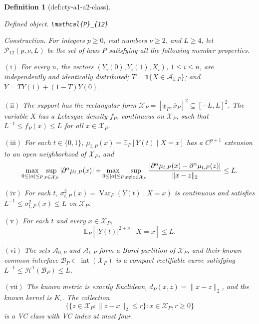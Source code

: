 \documentclass{article}
\newtheorem{definition}{Definition}
\begin{document}
\begin{definition}[def:cty-a1-a2-class]\label{def:cty-a1-a2-class}
\par\smallskip\noindent\emph{Defined object.} \texttt{\textbackslash{}\allowbreak{}mathcal\{P\}\allowbreak{}\_\allowbreak{}\{12\}\allowbreak{}}
\par\smallskip\noindent\emph{Construction.} For integers \(p\geq0\), real numbers \(\nu\geq2\), and \(L\geq4\), let \(\mathcal P_{12}(p,\nu,L)\) be the set of laws \(P\) satisfying all the following member properties.

\(\mathrm{(i)}\) For every \(n\), the vectors \((Y_i(0),Y_i(1),X_i)\), \(1\leq i\leq n\), are independently and identically distributed; \(T=\mathbf 1\{X\in\mathcal A_{1,P}\}\); and \(Y=TY(1)+(1-T)Y(0)\).

\(\mathrm{(ii)}\) The support has the rectangular form \(\mathcal X_P=[\underline x_P,\overline x_P]^2\subseteq[-L,L]^2\).  The variable \(X\) has a Lebesgue density \(f_P\), continuous on \(\mathcal X_P\), such that \(L^{-1}\leq f_P(x)\leq L\) for all \(x\in\mathcal X_P\).

\(\mathrm{(iii)}\) For each \(t\in\{0,1\}\), \(\mu_{t,P}(x)=\mathbb E_P[Y(t)\mid X=x]\) has a \(C^{p+1}\) extension to an open neighborhood of \(\mathcal X_P\), and
\[
 \max_{0\leq|\alpha|\leq p}\sup_{x\in\mathcal X_P}|\partial^\alpha\mu_{t,P}(x)|
 +\max_{0\leq|\alpha|\leq p}\sup_{x\neq z\in\mathcal X_P}
 { |\partial^\alpha\mu_{t,P}(x)-\partial^\alpha\mu_{t,P}(z)|\over\lVert x-z\rVert_2}
 \leq L.
\]

\(\mathrm{(iv)}\) For each \(t\), \(\sigma^2_{t,P}(x)=\operatorname{Var}_P(Y(t)\mid X=x)\) is continuous and satisfies \(L^{-1}\leq\sigma^2_{t,P}(x)\leq L\) on \(\mathcal X_P\).

\(\mathrm{(v)}\) For each \(t\) and every \(x\in\mathcal X_P\),
\[
 \mathbb E_P[|Y(t)|^{2+\nu}\mid X=x]\leq L.
\]

\(\mathrm{(vi)}\) The sets \(\mathcal A_{0,P}\) and \(\mathcal A_{1,P}\) form a Borel partition of \(\mathcal X_P\), and their known common interface \(\mathcal B_P\subset\operatorname{int}(\mathcal X_P)\) is a compact rectifiable curve satisfying \(L^{-1}\leq\mathcal H^1(\mathcal B_P)\leq L\).

\(\mathrm{(vii)}\) The known metric is exactly Euclidean, \(d_P(x,z)=\lVert x-z\rVert_2\), and the known kernel is \(K_\square\).  The collection
\[
 \{\{z\in\mathcal X_P:\lVert z-x\rVert_2\leq r\}:x\in\mathcal X_P, r\geq0\}
\]
is a VC class with VC index at most four.


\end{definition}
\end{document}
